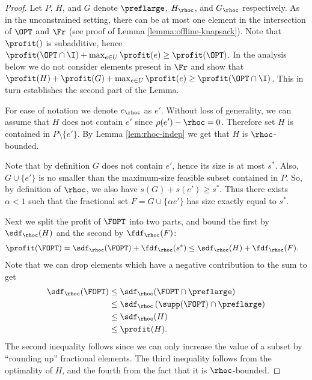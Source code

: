 \begin{proof}
Let $P$, $H$, and $G$ denote $\preflarge$, $H_{\rhoc}$, and
$G_{\rhoc}$ respectively. As in the unconstrained setting, there can
be at most one element in the intersection of $\OPT$ and $\Fr$ 
(see proof of Lemma \ref{lemma:offline-knapsack}). Note that $\profit()$ is subadditive, hence
$\profit( \OPT \cap \I) + \max_{e \in U } \profit(e) \geq
\profit(\OPT)$.  In the analysis below we do not consider elements
present in $\Fr$ and show that $\profit(H) + \profit(G) + \max_{e \in
  U } \profit(e) \geq \profit(\OPT \cap \I)$.  This in turn
establishes the second part of the Lemma.



For ease of notation we denote $e_\rhoc$ as $e'$. Without loss of
generality, we can assume that $H$ does not contain $e'$ since
$\rho(e') - \rhoc = 0$.  Therefore set $H$ is contained in $P
\setminus \{ e' \}$. By Lemma \ref{lem:rhoc-indep} we get that $H$ is
$\rhoc$-bounded.

Note that by definition $G$ does not contain $e'$, hence its size is
at most $s^*$.  Also, $G \cup \{e' \}$ is no smaller than the
maximum-size feasible subset contained in $P$. So, by definition of
$\rhoc$, we also have $s(G) + s(e') \geq s^*$. Thus there exists
$\alpha < 1$ such that the fractional set $F = G \cup \{ \alpha e' \}
$ has size exactly equal to $s^*$.





Next we split the profit of $\FOPT$ into two parts, and bound the first
by $\sdf_\rhoc(H)$ and the second by $\fdf_\rhoc (F)$:
\begin{align*}
  \profit(\FOPT) &= \sdf_\rhoc( \FOPT) + \fdf_\rhoc(s^*) 
  \leq \sdf_\rhoc(H) + \fdf_\rhoc(F) .
\end{align*}
\noindent Note that we can drop elements which have a negative contribution to
the sum to get
\begin{align*}
\sdf_\rhoc(\FOPT) & \leq \sdf_\rhoc(\FOPT \cap \preflarge ) \\
& \leq \sdf_\rhoc \left( \supp(\FOPT) \cap \preflarge \right) \\
& \leq \sdf_\rhoc(H) \\
& \leq \profit(H).
\end{align*}
The second inequality follows since we can only increase the value of
a subset by ``rounding up'' fractional elements. The third inequality
follows from the optimality of $H$, and the fourth from the fact that
it is $\rhoc$-bounded.


\end{proof}
